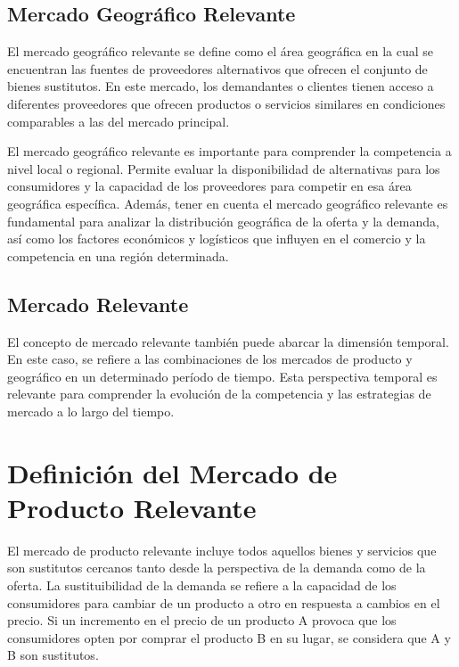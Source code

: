 \documentclass[
  letterpaper,
  DIV=11,
  numbers=noendperiod]{scrartcl}
\begin{document}
\hypertarget{mercado-geogruxe1fico-relevante}{%
\subsection{Mercado Geográfico
Relevante}\label{mercado-geogruxe1fico-relevante}}

El mercado geográfico relevante se define como el área geográfica en la
cual se encuentran las fuentes de proveedores alternativos que ofrecen
el conjunto de bienes sustitutos. En este mercado, los demandantes o
clientes tienen acceso a diferentes proveedores que ofrecen productos o
servicios similares en condiciones comparables a las del mercado
principal.

El mercado geográfico relevante es importante para comprender la
competencia a nivel local o regional. Permite evaluar la disponibilidad
de alternativas para los consumidores y la capacidad de los proveedores
para competir en esa área geográfica específica. Además, tener en cuenta
el mercado geográfico relevante es fundamental para analizar la
distribución geográfica de la oferta y la demanda, así como los factores
económicos y logísticos que influyen en el comercio y la competencia en
una región determinada.

\hypertarget{mercado-relevante}{%
\subsection{Mercado Relevante}\label{mercado-relevante}}

El concepto de mercado relevante también puede abarcar la dimensión
temporal. En este caso, se refiere a las combinaciones de los mercados
de producto y geográfico en un determinado período de tiempo. Esta
perspectiva temporal es relevante para comprender la evolución de la
competencia y las estrategias de mercado a lo largo del tiempo.

\hypertarget{definiciuxf3n-del-mercado-de-producto-relevante}{%
\section{Definición del Mercado de Producto
Relevante}\label{definiciuxf3n-del-mercado-de-producto-relevante}}

El mercado de producto relevante incluye todos aquellos bienes y
servicios que son sustitutos cercanos tanto desde la perspectiva de la
demanda como de la oferta. La sustituibilidad de la demanda se refiere a
la capacidad de los consumidores para cambiar de un producto a otro en
respuesta a cambios en el precio. Si un incremento en el precio de un
producto A provoca que los consumidores opten por comprar el producto B
en su lugar, se considera que A y B son sustitutos.
\end{document}
